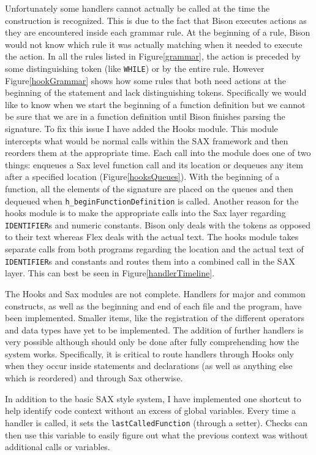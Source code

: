 \documentclass[12pt]{report}
\def\lstlistingname{Figure}
\newcommand{\refCode}{\lstlistingname \hspace{1mm}}
\begin{document}
Unfortunately some handlers cannot actually be called at the time the construction is recognized. This 
is due to the fact that Bison executes actions as they are encountered inside each grammar rule. At the 
beginning of a rule, Bison would not know which rule it was actually matching when it needed to 
execute the action. In all the rules listed in \refCode \ref{grammar}, the action is preceded by some 
distinguishing token (like \lstinline{WHILE}) or by the entire rule. However \refCode \ref{hookGrammar} 
shows how some rules that both need actions at the beginning of the statement and lack distinguishing 
tokens. Specifically we would like to know when we start the beginning of a function definition but we 
cannot be sure that we are in a function definition until Bison finishes parsing the signature. To fix this 
issue I have added the Hooks module. This module intercepts what would be normal calls within the 
SAX framework and then reorders them at the appropriate time. Each call into the module does one of 
two things: enqueues a Sax level function call and its location or dequeues any item after a specified 
location (\refCode \ref{hooksQueues}). With the beginning of a function, all the elements of the 
signature are placed on the queues and then dequeued when \lstinline{h_beginFunctionDefinition} is 
called. Another reason for the hooks module is to make the appropriate calls into the Sax layer 
regarding \lstinline{IDENTIFIER}s and numeric constants. Bison only deals with the tokens as opposed 
to their text whereas Flex deals with the actual text. The hooks module takes separate calls from both 
programs regarding the location and the actual text of \lstinline{IDENTIFIER}s and constants and routes 
them into a combined call in the SAX layer. This can best be seen in \refCode \ref{handlerTimeline}.

The Hooks and Sax modules are not complete. Handlers for major and common constructs, as well as 
the beginning and end of each file and the program, have been implemented. Smaller items, like the 
registration of the different operators and data types have yet to be implemented. The addition of further 
handlers is very possible although should only be done after fully comprehending how the system 
works. Specifically, it is critical to route handlers through Hooks only when they occur inside statements 
and declarations (as well as anything else which is reordered) and through Sax otherwise.

In addition to the basic SAX style system, I have implemented one shortcut to help identify code context 
without an excess of global variables. Every time a handler is called, it sets the 
\lstinline{lastCalledFunction} (through a setter). Checks can then use this variable to easily figure out 
what the previous context was without additional calls or variables.
\end{document}
